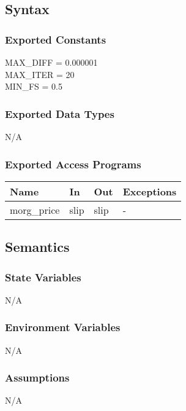 \documentclass[12pt, titlepage]{article}
\begin{document}
\subsection{Syntax}

\subsubsection{Exported Constants}
MAX\_DIFF = 0.000001\\
MAX\_ITER = 20\\
MIN\_FS = 0.5\\

\subsubsection{Exported Data Types}
N/A

\subsubsection{Exported Access Programs}

\begin{center}
	\renewcommand*{\arraystretch}{1.5}
	\begin{tabular} {p{}  p{}  p{} 
			p{} } \hline 
		\textbf{Name} & \textbf{In} & \textbf{Out} & \textbf{Exceptions} \\ 
		\hline

  morg\_price & slip & slip & - \\ \hline
\end{tabular}
\end{center}

\subsection{Semantics}

\subsubsection{State Variables}
N/A

\subsubsection{Environment Variables}
N/A

\subsubsection{Assumptions}
N/A
 
\end{document}
